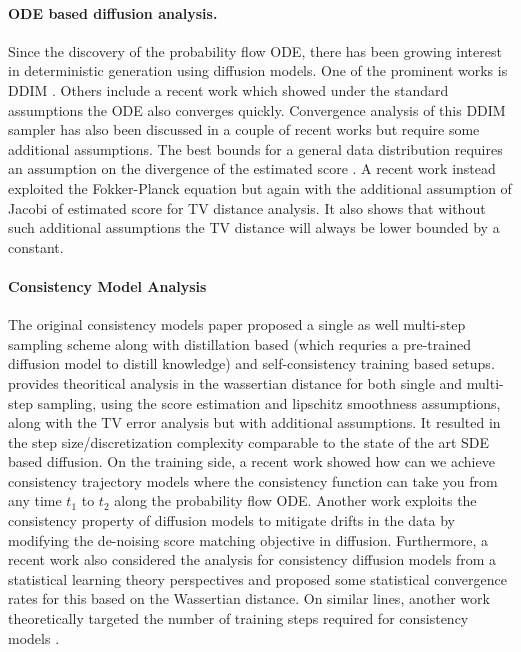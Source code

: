 \documentclass[11pt]{article}
\begin{document}
\paragraph{ODE based diffusion analysis.} 
Since the discovery of the probability flow ODE, there has been growing interest in deterministic generation using diffusion models.
 One of the prominent works is DDIM \cite{song2020denoising}.
Others include a recent work \cite{chen2023probability} which showed under the standard assumptions the ODE also converges quickly.
Convergence analysis of this DDIM sampler has also been discussed in a couple of recent works \cite{li2024sharp, gao2024convergence, huang2025convergence, li2023towards, li2024unified} but require some additional assumptions. The best bounds for a general data distribution requires an assumption on the divergence of the estimated score \cite{li2024sharp}. A recent work \cite{li2024unified} instead exploited the Fokker-Planck equation but again with the additional assumption of Jacobi of estimated score for TV distance analysis. It also shows that without such additional assumptions the TV distance will always be lower bounded by a constant. 


\paragraph{Consistency Model Analysis} The original consistency models paper \cite{song2023consistency} proposed a single as well multi-step sampling scheme along with distillation based (which requries a pre-trained diffusion model to distill knowledge) and self-consistency training based setups. \cite{lyu2024sampling} provides theoritical analysis in the wassertian distance for both single and multi-step sampling, using the score estimation and lipschitz smoothness assumptions, along with the TV error analysis but with additional assumptions. It resulted in the step size/discretization complexity comparable to the state of the art SDE based diffusion. On the training side, a recent work showed how can we achieve consistency trajectory models \cite{kim2023consistency} where the consistency function can take you from any time $t_1$ to $t_2$ along the probability flow ODE. Another work \cite{daras2023consistent} exploits the consistency property of diffusion models to mitigate drifts in the data by modifying the de-noising score matching objective in diffusion. Furthermore, a recent work \cite{dou2024theory} also considered the analysis for consistency diffusion models from a statistical learning theory perspectives and proposed some statistical convergence rates for this based on the Wassertian distance. On similar lines, another work theoretically targeted the number of training steps required for consistency models \cite{li2024towards}.
\end{document}
